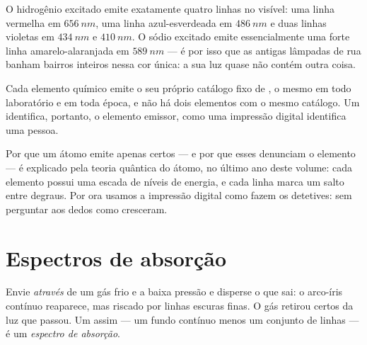 \begin{example}\label{ex:g10:light-spectra:hydrogen}
O hidrogênio excitado emite exatamente quatro linhas no visível: uma linha
vermelha em $\qty{656}{nm}$, uma linha azul-esverdeada em $\qty{486}{nm}$ e
duas linhas violetas em $\qty{434}{nm}$ e $\qty{410}{nm}$. O sódio excitado
emite essencialmente uma forte linha amarelo-alaranjada em $\qty{589}{nm}$
--- é por isso que as antigas lâmpadas de rua banham bairros inteiros nessa
cor única: a sua luz quase não contém outra coisa.
\end{example}

\begin{proposition}\label{prop:g10:light-spectra:fingerprint}
Cada elemento químico emite o seu próprio catálogo fixo de , o mesmo em todo laboratório e em toda época, e não há dois
elementos com o mesmo catálogo. Um  identifica, portanto,
o elemento emissor, como uma impressão digital identifica uma pessoa.
\end{proposition}
\admitted

\begin{remark}\label{rem:g10:light-spectra:whylines}
Por que um átomo emite apenas certos  --- e por que
esses  denunciam o elemento --- é explicado pela teoria
quântica do átomo, no último ano deste volume: cada elemento possui uma
escada de níveis de energia, e cada linha marca um salto entre degraus. Por
ora usamos a impressão digital como fazem os detetives: sem perguntar aos
dedos como cresceram.
\end{remark}

\section{Espectros de absorção}

\begin{definition}\label{def:g10:light-spectra:absorption}
Envie  \emph{através} de um gás frio e a baixa pressão e disperse o
que sai: o arco-íris contínuo reaparece, mas riscado por linhas escuras
finas. O gás retirou certos  da luz que passou. Um
 assim --- um fundo contínuo menos um conjunto de linhas --- é um
\emph{espectro de absorção}.
\end{definition}

